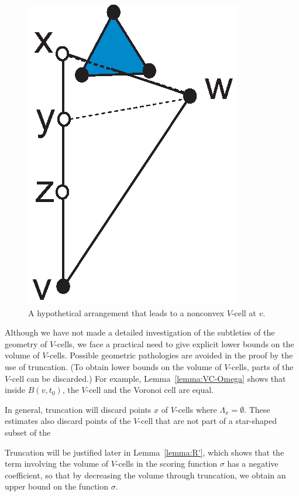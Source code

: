 \begin{figure}[htb]
  \centering
  \includegraphics{PS/nonstar.eps}
  \caption{A hypothetical arrangement that leads to a nonconvex
   $V$-cell at $v$.}
\label{fig:nonstar}
\end{figure}

\begin{remark} Although we have not made a detailed investigation
of the subtleties of the geometry of $V$-cells, we face a
practical need to give explicit lower bounds on the volume of
$V$-cells. Possible geometric pathologies are avoided in the proof
by the use of truncation.  (To obtain lower bounds on the volume
of $V$-cells, parts of the $V$-cell can be discarded.)  For
example, Lemma~\ref{lemma:VC-Omega} shows that inside $B(v,t_0)$,
the $V$-cell and the Voronoi cell are equal.

In general, truncation will discard points $x$ of $V$-cells where
$\Lambda_x = \emptyset$. These estimates also discard points of
the $V$-cell that are not part of a star-shaped subset of the

Truncation will be justified later in Lemma~\ref{lemma:R'}, which
shows that the term involving the volume of $V$-cells in the
scoring function $\sigma$ has a negative coefficient, so that by
decreasing the volume through truncation, we obtain an upper bound
on the function $\sigma$.
\end{remark}


